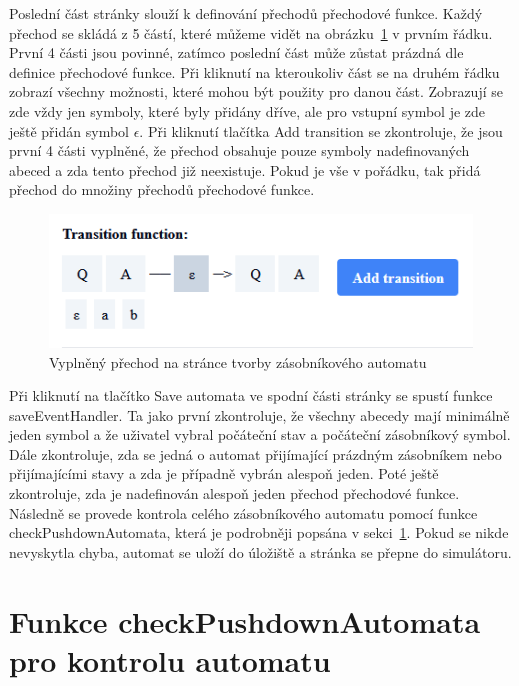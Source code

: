 Poslední část stránky slouží k definování přechodů přechodové funkce. Každý přechod se skládá z 5 částí, které můžeme vidět na obrázku~\ref{fig:FilledTransition} v prvním řádku. První 4 části jsou povinné, zatímco poslední část může zůstat prázdná dle definice přechodové funkce. Při kliknutí na kteroukoliv část se na druhém řádku zobrazí všechny možnosti, které mohou být použity pro danou část. Zobrazují se zde vždy jen symboly, které byly přidány dříve, ale pro vstupní symbol je zde ještě přidán symbol $\epsilon$. Při kliknutí tlačítka Add transition se zkontroluje, že jsou první 4 části vyplněné, že přechod obsahuje pouze symboly nadefinovaných abeced a zda tento přechod již neexistuje. Pokud je vše v pořádku, tak přidá přechod do množiny přechodů přechodové funkce.

\begin{figure}[h]
    \centering
    \includegraphics{Figures/PrntScrn_FilledTransition.png}
    \caption{Vyplněný přechod na stránce tvorby zásobníkového automatu}\label{fig:FilledTransition}
\end{figure}

Při kliknutí na tlačítko Save automata ve spodní části stránky se spustí funkce saveEventHandler. Ta jako první zkontroluje, že všechny abecedy mají minimálně jeden symbol a že uživatel vybral počáteční stav a počáteční zásobníkový symbol. Dále zkontroluje, zda se jedná o automat přijímající prázdným zásobníkem nebo přijímajícími stavy a zda je případně vybrán alespoň jeden. Poté ještě zkontroluje, zda je nadefinován alespoň jeden přechod přechodové funkce. Následně se provede kontrola celého zásobníkového automatu pomocí funkce checkPushdownAutomata, která je podrobněji popsána v sekci~\ref{sec:checkPushdownAutomata}. Pokud se nikde nevyskytla chyba, automat se uloží do úložiště a stránka se přepne do simulátoru.

\section{Funkce checkPushdownAutomata pro kontrolu automatu}\label{sec:checkPushdownAutomata}

